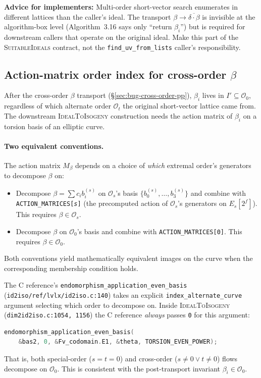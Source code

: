 \noindent
\textbf{Advice for implementers:}  Multi-order short-vector
search enumerates in different lattices than the caller's
ideal.  The transport
$\beta \to \overline{\delta \cdot \beta}$ is invisible at the
algorithm-box level (Algorithm~3.16 says only ``return
$\beta_i$'') but is required for downstream callers that
operate on the original ideal.  Make this part of the
\textsc{SuitableIdeals} contract, not the
\texttt{find\_uv\_from\_lists} caller's responsibility.

\subsection{Action-matrix order index for cross-order $\beta$}
\label{sec:bug-action-matrix-order-index}

After the cross-order $\beta$ transport
(\S\ref{sec:bug-cross-order-pp}), $\beta_i$ lives in
$I' \subseteq \mathcal{O}_0$, regardless of which alternate
order $\mathcal{O}_{t}$ the original short-vector lattice
came from.  The downstream \textsc{IdealToIsogeny}
construction needs the action matrix of $\beta_i$ on a
torsion basis of an elliptic curve.

\paragraph{Two equivalent conventions.}  The action matrix
$M_\beta$ depends on a choice of \emph{which} extremal order's
generators to decompose $\beta$ on:
\begin{itemize}
\item Decompose $\beta = \sum c_i b_i^{(s)}$ on
  $\mathcal{O}_s$'s basis $\{b_0^{(s)}, \ldots, b_3^{(s)}\}$
  and combine with \texttt{ACTION\_MATRICES[\textit{s}]} (the
  precomputed action of $\mathcal{O}_s$'s generators on
  $E_s[2^f]$).  This requires $\beta \in \mathcal{O}_s$.
\item Decompose $\beta$ on $\mathcal{O}_0$'s basis and combine
  with \texttt{ACTION\_MATRICES[0]}.  This requires
  $\beta \in \mathcal{O}_0$.
\end{itemize}
Both conventions yield mathematically equivalent images on
the curve when the corresponding membership condition holds.

The C reference's
\texttt{endomorphism\_application\_even\_basis}
(\texttt{id2iso/ref/lvlx/id2iso.c:140}) takes an explicit
\texttt{index\_alternate\_curve} argument selecting which
order to decompose on.  Inside
\textsc{IdealToIsogeny} (\texttt{dim2id2iso.c:1054, 1156})
the C reference \emph{always} passes \texttt{0} for this
argument:
\begin{lstlisting}[language=C]
endomorphism_application_even_basis(
    &bas2, 0, &Fv_codomain.E1, &theta, TORSION_EVEN_POWER);
\end{lstlisting}
That is, both special-order ($s = t = 0$) and cross-order
($s \neq 0 \lor t \neq 0$) flows decompose on $\mathcal{O}_0$.
This is consistent with the post-transport invariant
$\beta_i \in \mathcal{O}_0$.

